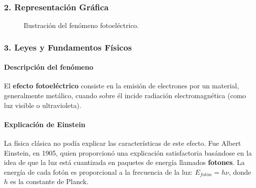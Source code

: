 \subsubsection*{2. Representación Gráfica}
\begin{figure}[H]
    \centering
    \caption{Ilustración del fenómeno fotoeléctrico.}
\end{figure}

\subsubsection*{3. Leyes y Fundamentos Físicos}
\paragraph{Descripción del fenómeno}
El \textbf{efecto fotoeléctrico} consiste en la emisión de electrones por un material, generalmente metálico, cuando sobre él incide radiación electromagnética (como luz visible o ultravioleta).

\paragraph{Explicación de Einstein}
La física clásica no podía explicar las características de este efecto. Fue Albert Einstein, en 1905, quien proporcionó una explicación satisfactoria basándose en la idea de que la luz está cuantizada en paquetes de energía llamados \textbf{fotones}. La energía de cada fotón es proporcional a la frecuencia de la luz: $E_{fotón} = h\nu$, donde $h$ es la constante de Planck.

